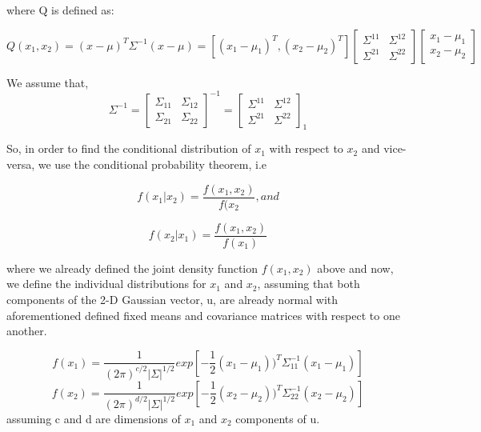 \documentclass[12pt,a4paper]{article}
\begin{document}
where Q is defined as:

\begin{equation*}

Q(x_1,x_2) = (x-\mu)^T\Sigma^{-1}(x-\mu) 
		 = [(x_1-\mu_1)^T,(x_2-\mu_2)^T]\begin{bmatrix}\Sigma^{11} & \Sigma^{12} \\ 
\Sigma^{21} & \Sigma^{22} 
\end{bmatrix} \begin{bmatrix}x_1-\mu_1 \\ x_2-\mu_2 \end{bmatrix}

\end{equation*}

We assume that,
\begin{equation*}
\Sigma^{-1} = \begin{bmatrix} \Sigma_{11} & \Sigma_{12} \\ 
\Sigma_{21} & \Sigma_{22} 
\end{bmatrix}^{-1}  = \begin{bmatrix}\Sigma^{11} & \Sigma^{12} \\ 
\Sigma^{21} & \Sigma^{22} 
\end{bmatrix}_1
\end{equation*}

So, in order to find the conditional distribution of $x_1$ with respect to $x_2$ and vice-versa, we use the conditional probability theorem, i.e

\begin{equation*}
f(x_1|x_2) = \frac{f(x_1,x_2)}{f(x_2} , and
\end{equation*}

\begin{equation*}
f(x_2|x_1) = \frac{f(x_1,x_2)}{f(x_1)}
\end{equation*} 

where we already defined the joint density function $f(x_1,x_2)$ above and now, we define the individual distributions for $x_1$ and $x_2$, assuming that both components of the 2-D Gaussian vector, u, are already normal with aforementioned defined fixed means and covariance matrices with respect to one another. 

\begin{equation*}
f(x_1) = \frac{1}{(2\pi )^{c/2}|\Sigma|^{1/2}}exp[-\frac{1}{2}(x_1-\mu_1))^T\Sigma_{11}^{-1}(x_1-\mu_1)] 
\end{equation*}
\begin{equation*}
f(x_2) = \frac{1}{(2\pi )^{d/2}|\Sigma|^{1/2}}exp[-\frac{1}{2}(x_2-\mu_2))^T\Sigma_{22}^{-1}(x_2-\mu_2)]
\end{equation*}
assuming c and d are dimensions of $x_1$ and $x_2$ components of u.
\end{document}
